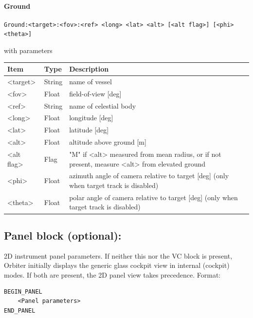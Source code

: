 \documentclass[Orbiter Developer Manual.tex]{subfiles}
\begin{document}
\paragraph{Ground}
\begin{lstlisting}[language=OSFS]
Ground:<target>:<fov>:<ref> <long> <lat> <alt> [<alt flag>] [<phi> <theta>]
\end{lstlisting}

\noindent
with parameters

\begin{table}[H]
	\centering
	\begin{tabularx}{\textwidth}{ |l|l|X| }
	\hline\rule{0pt}{2ex}
	\textbf{Item} & \textbf{Type} & \textbf{Description}\\
	\hline\rule{0pt}{2ex}
	<target> & String & name of vessel\\
	\hline\rule{0pt}{2ex}
	<fov> & Float &field-of-view [deg]\\
	\hline\rule{0pt}{2ex}
	<ref> & String & name of celestial body\\
	\hline\rule{0pt}{2ex}
	<long> & Float & longitude [deg]\\
	\hline\rule{0pt}{2ex}
	<lat> & Float & latitude [deg]\\
	\hline\rule{0pt}{2ex}
	<alt> & Float & altitude above ground [m]\\
	\hline\rule{0pt}{2ex}
	<alt flag> & Flag & "M" if <alt> measured from mean radius, or if not present, measure <alt> from elevated ground\\
	\hline\rule{0pt}{2ex}
	<phi> & Float & azimuth angle of camera relative to target [deg] (only when target track is disabled)\\
	\hline\rule{0pt}{2ex}
	<theta> & Float & polar angle of camera relative to target [deg] (only when target track is disabled)\\
	\hline
	\end{tabularx}
\end{table}




\subsection*{Panel block (optional):}
2D instrument panel parameters. If neither this nor the VC block is present, Orbiter initially displays the generic glass cockpit view in internal (cockpit) modes. If both are present, the 2D panel view takes precedence. Format:

\begin{lstlisting}[language=OSFS]
BEGIN_PANEL
	<Panel parameters>
END_PANEL
\end{lstlisting}
\end{document}
